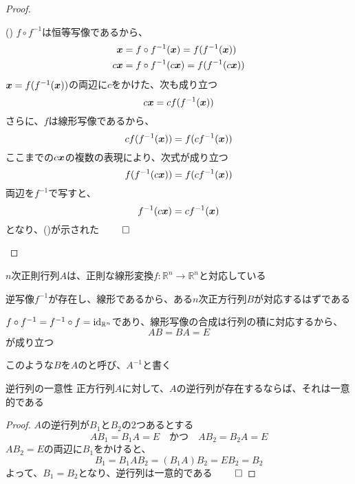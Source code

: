 \documentclass[../../../topic_linear-algebra]{subfiles}
\begin{document}
\begin{proof}
  \begin{subpattern}{()}
    $f \circ f^{-1}$は恒等写像であるから、
    \begin{align*}
      \vb*{x}  & = f \circ f^{-1}(\vb*{x}) = f(f^{-1}(\vb*{x}))   \\
      c\vb*{x} & = f \circ f^{-1}(c\vb*{x}) = f(f^{-1}(c\vb*{x}))
    \end{align*}
    $\vb*{x}= f(f^{-1}(\vb*{x}))$の両辺に$c$をかけた、次も成り立つ
    \begin{equation*}
      c\vb*{x} = c f(f^{-1}(\vb*{x}))
    \end{equation*}
    さらに、$f$は線形写像であるから、
    \begin{equation*}
      c f(f^{-1}(\vb*{x})) = f(c f^{-1}(\vb*{x}))
    \end{equation*}
    ここまでの$c\vb*{x}$の複数の表現により、次式が成り立つ
    \begin{equation*}
      f(f^{-1}(c\vb*{x})) = f(c f^{-1}(\vb*{x}))
    \end{equation*}
    両辺を$f^{-1}$で写すと、
    \begin{equation*}
      f^{-1}(c\vb*{x}) = c f^{-1}(\vb*{x})
    \end{equation*}
    となり、()が示された $\qed$
  \end{subpattern}
\end{proof}

\sectionline

$n$次正則行列$A$は、正則な線形変換$f\colon \mathbb{R}^n \to \mathbb{R}^n$と対応している

逆写像$f^{-1}$が存在し、線形であるから、ある$n$次正方行列$B$が対応するはずである

\br

$f \circ f^{-1} = f^{-1} \circ f = \operatorname{id}_{\mathbb{R}^n}$であり、線形写像の合成は行列の積に対応するから、
\begin{equation*}
  AB = BA = E
\end{equation*}
が成り立つ

\br

このような$B$を$A$のと呼び、$A^{-1}$と書く

\sectionline

\begin{theorem}{逆行列の一意性}
  正方行列$A$に対して、$A$の逆行列が存在するならば、それは一意的である
\end{theorem}

\begin{proof}
  $A$の逆行列が$B_1$と$B_2$の2つあるとする
  \begin{equation*}
    AB_1 = B_1A = E \quad \text{かつ} \quad AB_2 = B_2A = E
  \end{equation*}
  $AB_2 = E$の両辺に$B_1$をかけると、
  \begin{equation*}
    B_1 = B_1 AB_2 = (B_1 A) B_2 = E B_2 = B_2
  \end{equation*}
  よって、$B_1 = B_2$となり、逆行列は一意的である $\qed$
\end{proof}
\end{document}
